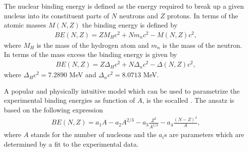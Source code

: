 \documentclass[letterpaper,10pt,english]{sphinxmanual}
\begin{document}
The nuclear binding energy is defined as the energy required to break
up a given nucleus into its constituent parts of \(N\) neutrons and \(Z\)
protons. In terms of the atomic masses \(M(N, Z)\) the binding energy is
defined by
\begin{equation*}
\begin{split}
BE(N, Z) = ZM_H c^2 + Nm_n c^2 - M(N, Z)c^2 ,
\end{split}
\end{equation*}
where \(M_H\) is the mass of the hydrogen atom and \(m_n\) is the mass of the neutron.
In terms of the mass excess the binding energy is given by
\begin{equation*}
\begin{split}
BE(N, Z) = Z\Delta_H c^2 + N\Delta_n c^2 -\Delta(N, Z)c^2 ,
\end{split}
\end{equation*}
where \(\Delta_H c^2 = 7.2890\) MeV and \(\Delta_n c^2 = 8.0713\) MeV.

A popular and physically intuitive model which can be used to parametrize
the experimental binding energies as function of \(A\), is the so\sphinxhyphen{}called
. The ansatz is based on the following expression
\begin{equation*}
\begin{split}
BE(N,Z) = a_1A-a_2A^{2/3}-a_3\frac{Z^2}{A^{1/3}}-a_4\frac{(N-Z)^2}{A},
\end{split}
\end{equation*}
where \(A\) stands for the number of nucleons and the \(a_i\)s are parameters which are determined by a fit
to the experimental data.
\end{document}
